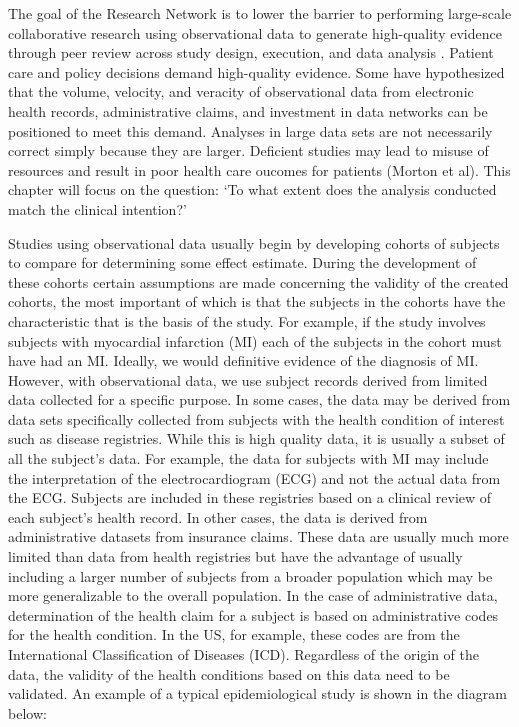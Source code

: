 \documentclass[11pt]{book}
\theoremstyle{definition}
\theoremstyle{definition}
\theoremstyle{definition}
\theoremstyle{remark}
\begin{document}
The goal of the Research Network is to lower the barrier to performing large-scale collaborative research using observational data to generate high-quality evidence through peer review across study design, execution, and data analysis \citep{Hripcsak2015}. Patient care and policy decisions demand high-quality evidence. Some have hypothesized that the volume, velocity, and veracity of observational data from electronic health records, administrative claims, and investment in data networks can be positioned to meet this demand. Analyses in large data sets are not necessarily correct simply because they are larger. Deficient studies may lead to misuse of resources and result in poor health care oucomes for patients (Morton et al). This chapter will focus on the question: `To what extent does the analysis conducted match the clinical intention?' 

Studies using observational data usually begin by developing cohorts of subjects to compare for determining some effect estimate. During the development of these cohorts certain assumptions are made concerning the validity of the created cohorts, the most important of which is that the subjects in the cohorts have the characteristic that is the basis of the study. For example, if the study involves subjects with myocardial infarction (MI) each of the subjects in the cohort must have had an MI. Ideally, we would definitive evidence of the diagnosis of MI. However, with observational data, we use subject records derived from limited data collected for a specific purpose. In some cases, the data may be derived from data sets specifically collected from subjects with the health condition of interest such as disease registries. While this is high quality data, it is usually a subset of all the subject's data. For example, the data for subjects with MI may include the interpretation of the electrocardiogram (ECG) and not the actual data from the ECG. Subjects are included in these registries based on a clinical review of each subject's health record. In other cases, the data is derived from administrative datasets from insurance claims. These data are usually much more limited than data from health registries but have the advantage of usually including a larger number of subjects from a broader population which may be more generalizable to the overall population. In the case of administrative data, determination of the health claim for a subject is based on administrative codes for the health condition. In the US, for example, these codes are from the International Classification of Diseases (ICD). Regardless of the origin of the data, the validity of the health conditions based on this data need to be validated.
An example of a typical epidemiological study is shown in the diagram below:  
\end{document}

